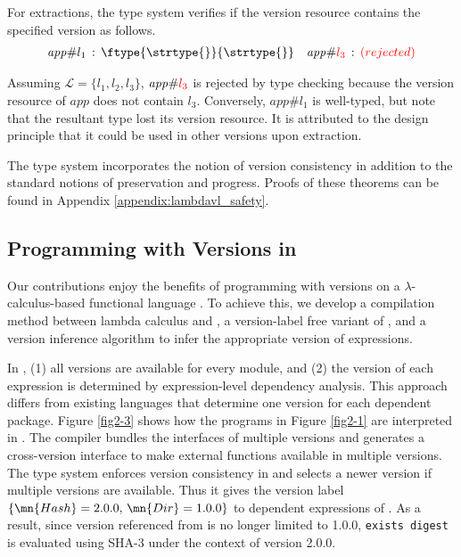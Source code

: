 For extractions, the type system verifies if the version resource contains the specified version as follows.
\begin{align*}
\mathit{app}\#l_1\,:\,\ftype{\strtype{}}{\strtype{}} \quad
\mathit{app}\#{\textcolor{red}{l_3}}\,:\,\textcolor{red}{(rejected)}
\end{align*}

Assuming $\mathcal{L} = \{l_1,l_2,l_3\}$, $\mathit{app}\#{\textcolor{red}{l_3}}$ is rejected by type checking because the version resource of $\mathit{app}$ does not contain $l_3$. Conversely, $\mathit{app}\#l_1$ is well-typed, but note that the resultant type lost its version resource. It is attributed to the design principle that it could be used in other versions upon extraction.

The \corelang{} type system incorporates the notion of version consistency in addition to the standard notions of preservation and progress. Proofs of these theorems can be found in Appendix \ref{appendix:lambdavl_safety}.





\subsection{Programming with Versions in \mylang{}}

Our contributions enjoy the benefits of programming with versions on a $\lambda$-calculus-based functional language \mylang{}. To achieve this, we develop a compilation method between lambda calculus and \vlmini{}, a version-label free variant of \corelang{}, and a version inference algorithm to infer the appropriate version of expressions.

In \mylang{}, (1) all versions are available for every module, and (2) the version of each expression is determined by expression-level dependency analysis. This approach differs from existing languages that determine one version for each dependent package.
Figure \ref{fig2-3} shows how the programs in Figure \ref{fig2-1} are interpreted in \mylang{}.
The \mylang{} compiler bundles the interfaces of multiple versions and generates a cross-version interface to make external functions available in multiple versions.
The \mylang{} type system enforces version consistency in  and selects a newer version if multiple versions are available. Thus it gives the version label $\{\mn{Hash} = 2.0.0,\,\mn{Dir} = 1.0.0\}$ to dependent expressions of . As a result, since  version referenced from  is no longer limited to 1.0.0, \texttt{exists digest} is evaluated using SHA-3 under the context of  version 2.0.0.

